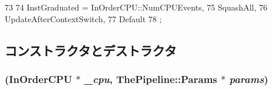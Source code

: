 \begin{DoxyCode}
73                           {
74         InstGraduated = InOrderCPU::NumCPUEvents,
75         SquashAll,
76         UpdateAfterContextSwitch,
77         Default
78     };
\end{DoxyCode}


\subsection{コンストラクタとデストラクタ}
\hypertarget{classResourcePool_a765bddb90f804d1ddebbc19b3459bb2e}{
\subsubsection[{ResourcePool}]{ ({\bf InOrderCPU} $\ast$ {\em \_\-cpu}, \/  {\bf ThePipeline::Params} $\ast$ {\em params})}}
\label{classResourcePool_a765bddb90f804d1ddebbc19b3459bb2e}



